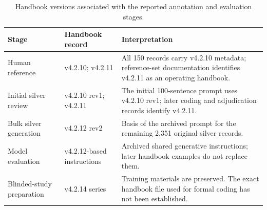 \documentclass[fleqn,12pt]{wlpeerj}
\begin{document}
\setcounter{table}{10}
\begin{table}[!htbp]
\caption{Handbook versions associated with the reported annotation and evaluation stages.}
\label{tab:handbook-stage-records}
\centering\small
\setlength{\tabcolsep}{4pt}
\begin{tabularx}{\linewidth}{@{}P{.22\linewidth}P{.23\linewidth}L@{}}
\toprule
Stage & Handbook record & Interpretation \\
\midrule
Human reference & v4.2.10; v4.2.11 & All 150 records carry v4.2.10 metadata; reference-set documentation identifies v4.2.11 as an operating handbook. \\
Initial silver review & v4.2.10 rev1; v4.2.11 & The initial 100-sentence prompt uses v4.2.10 rev1; later coding and adjudication records identify v4.2.11. \\
Bulk silver generation & v4.2.12 rev2 & Basis of the archived prompt for the remaining 2,351 original silver records. \\
Model evaluation & v4.2.12-based instructions & Archived shared generative instructions; later handbook examples do not replace them. \\
Blinded-study preparation & v4.2.14 series & Training materials are preserved. The exact handbook file used for formal coding has not been established. \\
\bottomrule
\end{tabularx}
\end{table}

\end{document}
